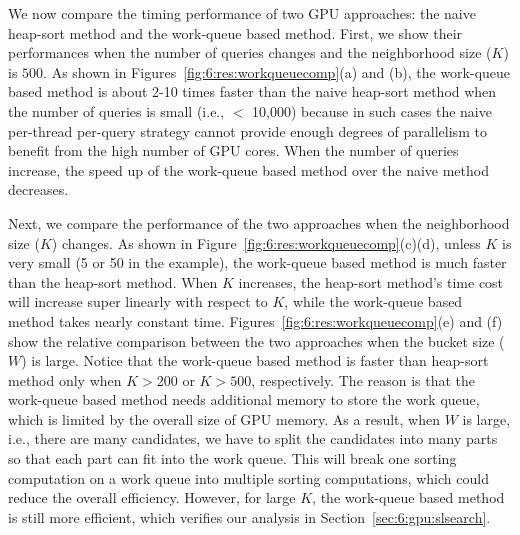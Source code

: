 We now compare the timing performance of two GPU approaches: the naive heap-sort method and the work-queue based method. First, we show their performances when the number of queries changes and the neighborhood size ($K$) is $500$. As shown in Figures~\ref{fig:6:res:workqueuecomp}(a) and (b), the work-queue based method is about 2-10 times faster than the naive heap-sort method when the number of queries is small (i.e., $<$ 10,000) because in such cases the naive per-thread per-query strategy cannot provide enough degrees of parallelism to benefit from the high number of GPU cores. When the number of queries increase, the speed up of the work-queue based method over the naive method decreases.

Next, we compare the performance of the two approaches when the neighborhood size ($K$) changes. As shown in Figure~\ref{fig:6:res:workqueuecomp}(c)(d), unless $K$ is very small (5 or 50 in the example), the work-queue based method is much faster than the heap-sort method. When $K$ increases, the heap-sort method's time cost will increase super linearly with respect to $K$, while the work-queue based method takes nearly constant time. Figures~\ref{fig:6:res:workqueuecomp}(e) and (f) show the relative comparison between the two approaches when the bucket size ($W$) is large. Notice that the work-queue based method is faster than heap-sort method only when $K > 200$ or $K > 500$, respectively. The reason is that the work-queue based method needs additional memory to store the work queue, which is limited by the overall size of GPU memory. As a result, when $W$ is large, i.e., there are many candidates, we have to split the candidates into many parts so that each part can fit into the work queue. This will break one sorting computation on a work queue into multiple sorting computations, which could reduce the overall efficiency. However, for large $K$, the work-queue based method is still more efficient, which verifies our analysis in Section~\ref{sec:6:gpu:slsearch}.


